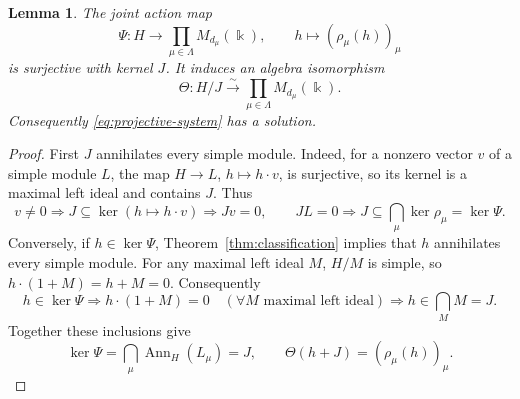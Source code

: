 \documentclass[10pt,oneside]{amsart}
\newcommand{\kk}{\Bbbk}
\newtheorem{lemma}[proposition]{Lemma}
\theoremstyle{definition}
\begin{document}
\begin{lemma}\label{lem:semisimple-action-detailed}
The joint action map
\[
 \Psi:H\longrightarrow\prod_{\mu\in\Lambda}M_{d_\mu}(\kk),\qquad
 h\longmapsto(\rho_\mu(h))_\mu
\]
is surjective with kernel $J$. It induces an algebra isomorphism
\[
 \Theta:H/J\xrightarrow{\ \sim\ }\prod_{\mu\in\Lambda}M_{d_\mu}(\kk).
\]
Consequently \eqref{eq:projective-system} has a solution.
\end{lemma}
\begin{proof}
First $J$ annihilates every simple module. Indeed, for a nonzero vector
$v$ of a simple module $L$, the map $H\to L$, $h\mapsto h\cdot v$,
is surjective, so its kernel is a maximal left ideal and contains $J$.
Thus
\[
 v\ne0\Longrightarrow J\subseteq\ker(h\mapsto h\cdot v)
 \Longrightarrow Jv=0,\qquad
 JL=0\Longrightarrow J\subseteq\bigcap_\mu\ker\rho_\mu=\ker\Psi.
\]
Conversely, if $h\in\ker\Psi$, Theorem~\ref{thm:classification} implies
that $h$ annihilates every simple module. For any maximal left ideal $M$,
$H/M$ is simple, so $h\cdot(1+M)=h+M=0$. Consequently
\[
 h\in\ker\Psi
 \Longrightarrow h\cdot(1+M)=0\quad(\forall M\text{ maximal left ideal})
 \Longrightarrow h\in\bigcap_M M=J.
\]
Together these inclusions give
\[
 \ker\Psi=\bigcap_\mu\operatorname{Ann}_H(L_\mu)=J,
 \qquad \Theta(h+J)=(\rho_\mu(h))_\mu.
\]


\end{proof}
\end{document}
